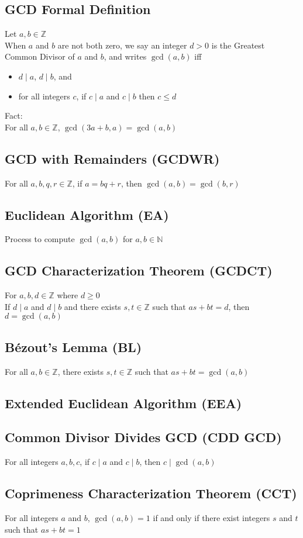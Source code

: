 \documentclass[12pt, letterpaper]{article}
\begin{document}
\subsection{GCD Formal Definition}
Let $a,b \in \mathbb{Z}$ \\
When $a$ and $b$ are not both zero, we say an integer $d>0$ is the Greatest Common Divisor of $a$ and $b$, and writes $\gcd(a,b)$ iff 
\begin{itemize}
    \item $d \mid a$, $d \mid b$, and 
    \item for all integers $c$, if $c \mid a$ and $c \mid b$ then $c \leq d$
\end{itemize}
Fact: \\
For all $a,b \in \mathbb{Z}$, $\gcd(3a+b, a) = \gcd(a,b)$
\subsection{GCD with Remainders (GCDWR)}
For all $a,b,q,r \in \mathbb{Z}$, if $a = bq+r$, then $\gcd(a,b) = \gcd(b,r)$
\subsection{Euclidean Algorithm (EA)}
Process to compute $\gcd(a,b)$ for $a,b \in \mathbb{N}$
\subsection{GCD Characterization Theorem (GCDCT)}
For $a,b,d \in \mathbb{Z}$ where $d \geq 0$ \\
If $d \mid a$ and $d \mid b$ and there exists $s,t \in \mathbb{Z}$ such that $as+bt=d$, then $d = \gcd(a,b)$
\subsection{B\'ezout's Lemma (BL)}
For all $a,b \in \mathbb{Z}$, there exists $s,t \in \mathbb{Z}$ such that $as+bt = \gcd(a,b)$
\subsection{Extended Euclidean Algorithm (EEA)}
\subsection{Common Divisor Divides GCD (CDD GCD)} 
For all integers $a,b,c$, if $c\mid a$ and $c\mid b$, then $c\mid \gcd(a,b)$
\subsection{Coprimeness Characterization Theorem (CCT)}
For all integers $a$ and $b$, $\gcd(a, b) = 1$ if and only if there exist integers $s$ and $t$ such that
$as + bt = 1$
\end{document}

